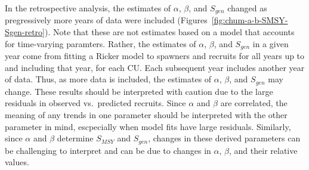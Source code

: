 \documentclass[11pt]{book}
\begin{document}
In the retrospective analysis, the estimates of \(\alpha\), \(\beta\), and \(S_{gen}\) changed as pregressively more years of data were included (Figures~\ref{fig:chum-a-b-SMSY-Sgen-retro}). Note that these are not estimates based on a model that accounts for time-varying paramters. Rather, the estimates of \(\alpha\), \(\beta\), and \(S_{gen}\) in a given year come from fitting a Ricker model to spawners and recruits for all years up to and including that year, for each CU. Each subsequent year includes another year of data. Thus, as more data is included, the estimates of \(\alpha\), \(\beta\), and \(S_{gen}\) may change. These results should be interpreted with caution due to the large residuals in observed vs.~predicted recruits. Since \(\alpha\) and \(\beta\) are correlated, the meaning of any trends in one parameter should be interpreted with the other parameter in mind, escpecially when model fits have large residuals. Similarly, since \(\alpha\) and \(\beta\) determine \(S_{MSY}\) and \(S_{gen}\), changes in these derived parameters can be challenging to interpret and can be due to changes in \(\alpha\), \(\beta\), and their relative values.
\end{document}
